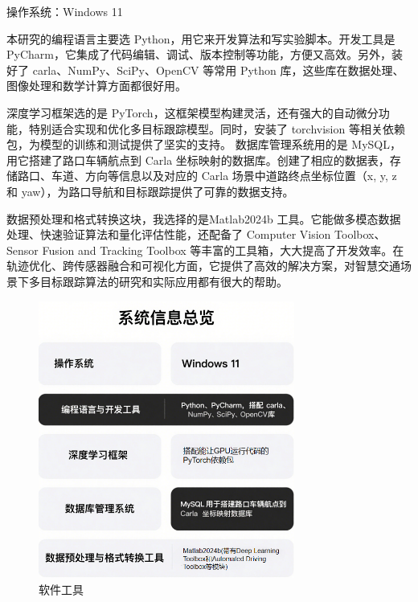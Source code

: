 操作系统：Windows 11

本研究的编程语言主要选 Python，用它来开发算法和写实验脚本。开发工具是 PyCharm，它集成了代码编辑、调试、版本控制等功能，方便又高效。另外，装好了 carla、NumPy、SciPy、OpenCV 等常用 Python 库，这些库在数据处理、图像处理和数学计算方面都很好用。

深度学习框架选的是 PyTorch，这框架模型构建灵活，还有强大的自动微分功能，特别适合实现和优化多目标跟踪模型。同时，安装了 torchvision 等相关依赖包，为模型的训练和测试提供了坚实的支持。
数据库管理系统用的是 MySQL，用它搭建了路口车辆航点到 Carla 坐标映射的数据库。创建了相应的数据表，存储路口、车道、方向等信息以及对应的 Carla 场景中道路终点坐标位置（x, y, z 和 yaw），为路口导航和目标跟踪提供了可靠的数据支持。

数据预处理和格式转换这块，我选择的是Matlab2024b 工具。它能做多模态数据处理、快速验证算法和量化评估性能，还配备了 Computer Vision Toolbox、Sensor Fusion and Tracking Toolbox 等丰富的工具箱，大大提高了开发效率。在轨迹优化、跨传感器融合和可视化方面，它提供了高效的解决方案，对智慧交通场景下多目标跟踪算法的研究和实际应用都有很大的帮助。




\begin{figure}[htbp] %
	\centering
	\includegraphics[width=0.75\textwidth]{p31} %
	\caption{软件工具} %
	\label{fig:p31} %
\end{figure}









